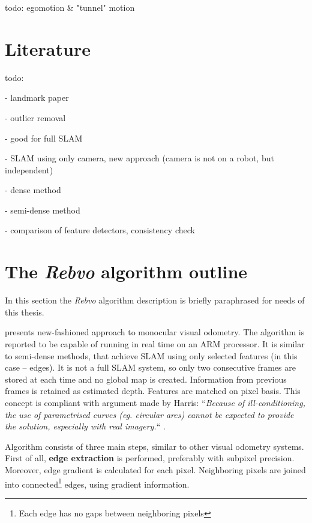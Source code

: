 todo: egomotion \& "tunnel" motion
\cite{vehicle_egomotion} \cite{recovery_of_egomotion}




\section{Literature}
\label{sec:stateoftheart}

todo:

\cite{visual_odometry} - landmark paper

\cite{fast_monocular} \cite{costeira1998multibody} - outlier removal

\cite{spatiotemporal} - good for full SLAM

\cite{a_kalman}

\cite{monoslam} - SLAM using only camera, new approach (camera is not on a robot, but independent)

\cite{mouragnon2006real}

\cite{robust_visual_odometry_estimation} - dense method

\cite{semi_dense} - semi-dense method

\cite{a_stereo_visual} - comparison of feature detectors, consistency check


\section{The \textit{Rebvo} algorithm outline}
\label{sec:rebvo_outline}

In this section the \textit{Rebvo} algorithm description is briefly paraphrased for needs of this thesis.

\cite{jose2015realtime} presents new-fashioned approach to monocular visual odometry. The algorithm is reported to be capable of running in real time on an ARM processor. It is similar to semi-dense methods, that achieve SLAM using only selected features (in this case -- edges). It is not a full SLAM system, so only two consecutive frames are stored at each time and no global map is created. Information from previous frames is retained as estimated depth. Features are matched on pixel basis. This concept is compliant with argument made by Harris: ``\textit{Because of ill-conditioning, the use of parametrised curves (eg. circular arcs) cannot be expected to provide the solution, especially with real imagery.}`` \cite{harris}.

Algorithm consists of three main steps, similar to other visual odometry systems. First of all, \textbf{edge extraction} is performed, preferably with subpixel precision. Moreover, edge gradient is calculated for each pixel. Neighboring pixels are joined into connected\footnote{Each edge has no gaps between neighboring pixels} edges, using gradient information.


